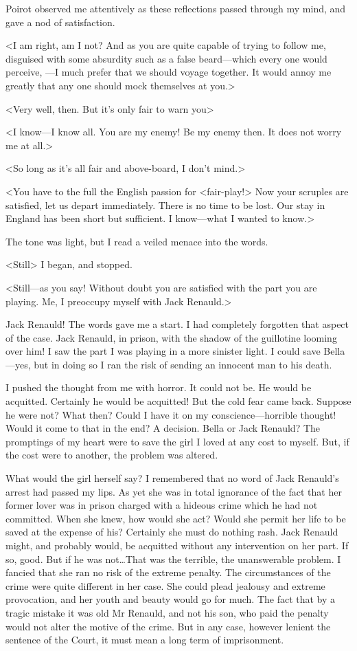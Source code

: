  Poirot observed me attentively as these reflections passed through my mind, and gave a nod of satisfaction. 

 <I am right, am I not? And as you are quite capable of trying to follow me, disguised with some absurdity such as a false beard—which every one would perceive, —I much prefer that we should voyage together. It would annoy me greatly that any one should mock themselves at you.> 

 <Very well, then. But it's only fair to warn you\longdash> 

 <I know—I know all. You are my enemy! Be my enemy then. It does not worry me at all.> 

 <So long as it's all fair and above-board, I don't mind.> 

 <You have to the full the English passion for <fair-play!> Now your scruples are satisfied, let us depart immediately. There is no time to be lost. Our stay in England has been short but sufficient. I know—what I wanted to know.> 

 The tone was light, but I read a veiled menace into the words. 

 <Still\longdash> I began, and stopped. 

 <Still—as you say! Without doubt you are satisfied with the part you are playing. Me, I preoccupy myself with Jack Renauld.> 

 Jack Renauld! The words gave me a start. I had completely forgotten that aspect of the case. Jack Renauld, in prison, with the shadow of the guillotine looming over him! I saw the part I was playing in a more sinister light. I could save Bella—yes, but in doing so I ran the risk of sending an innocent man to his death. 

 I pushed the thought from me with horror. It could not be. He would be acquitted. Certainly he would be acquitted! But the cold fear came back. Suppose he were not? What then? Could I have it on my conscience—horrible thought! Would it come to that in the end? A decision. Bella or Jack Renauld? The promptings of my heart were to save the girl I loved at any cost to myself. But, if the cost were to another, the problem was altered. 

 What would the girl herself say? I remembered that no word of Jack Renauld's arrest had passed my lips. As yet she was in total ignorance of the fact that her former lover was in prison charged with a hideous crime which he had not committed. When she knew, how would she act? Would she permit her life to be saved at the expense of his? Certainly she must do nothing rash. Jack Renauld might, and probably would, be acquitted without any intervention on her part. If so, good. But if he was not\dots That was the terrible, the unanswerable problem. I fancied that she ran no risk of the extreme penalty. The circumstances of the crime were quite different in her case. She could plead jealousy and extreme provocation, and her youth and beauty would go for much. The fact that by a tragic mistake it was old Mr Renauld, and not his son, who paid the penalty would not alter the motive of the crime. But in any case, however lenient the sentence of the Court, it must mean a long term of imprisonment. 

